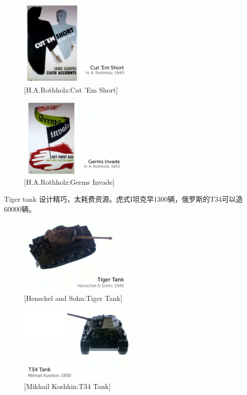 \documentclass[UTF8]{../../../../RepresentationUniverse}
\begin{document}
\begin{figure}[h]
    \centering
    \includegraphics[width=0.5\textwidth]{./src/figures/Cut 'Em Short_2023-04-09_20-13-40.png}
    \caption{[H.A.Rothholz:Cut 'Em Short]}
    \label{figure:Cut 'Em Short}
\end{figure}


\begin{figure}[h]
    \centering
    \includegraphics[width=0.5\textwidth]{./src/figures/Germs Invade_2023-04-09_20-15-26.png}
    \caption{[H.A.Rothholz:Germs Invade]}
    \label{figure:Germs Invade}
\end{figure}


Tiger tank 设计精巧，太耗费资源。虎式I坦克早1300辆，俄罗斯的T34可以造60000辆。
\begin{figure}[h]
    \centering
    \includegraphics[width=0.5\textwidth]{./src/figures/Tiger Tank_2023-04-09_20-17-37.png}
    \caption{[Henschel and Sohn:Tiger Tank]}
    \label{figure:Tiger Tank}
\end{figure}

\begin{figure}[h]
    \centering
    \includegraphics[width=0.5\textwidth]{./src/figures/T34 Tank_2023-04-09_20-22-47.png}
    \caption{[Mikhail Koshkin:T34 Tank]}
    \label{figure:T34 Tank}
\end{figure}
\end{document}
